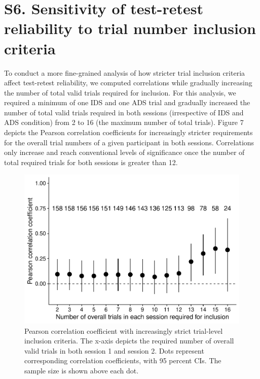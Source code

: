 \documentclass[
  man, donotrepeattitle,floatsintext]{apa6}
\begin{document}
\newpage

\hypertarget{s6.-sensitivity-of-test-retest-reliability-to-trial-number-inclusion-criteria}{%
\section{S6. Sensitivity of test-retest reliability to trial number inclusion criteria}\label{s6.-sensitivity-of-test-retest-reliability-to-trial-number-inclusion-criteria}}

To conduct a more fine-grained analysis of how stricter trial inclusion criteria affect test-retest reliability, we computed correlations while gradually increasing the number of total valid trials required for inclusion.
For this analysis, we required a minimum of one IDS and one ADS trial and gradually increased the number of total valid trials required in both sessions (irrespective of IDS and ADS condition) from 2 to 16 (the maximum number of total trials).
Figure 7 depicts the Pearson correlation coefficients for increasingly stricter requirements for the overall trial numbers of a given participant in both sessions.
Correlations only increase and reach conventional levels of significance once the number of total required trials for both sessions is greater than 12.

\begin{figure}
\centering
\includegraphics{MB1T_supplement_files/figure-latex/sfig7-1.pdf}
\caption{\label{fig:sfig7}Pearson correlation coefficient with increasingly strict trial-level inclusion criteria. The x-axis depicts the required number of overall valid trials in both session 1 and session 2. Dots represent corresponding correlation coefficients, with 95 percent CIs. The sample size is shown above each dot.}
\end{figure}
\end{document}
